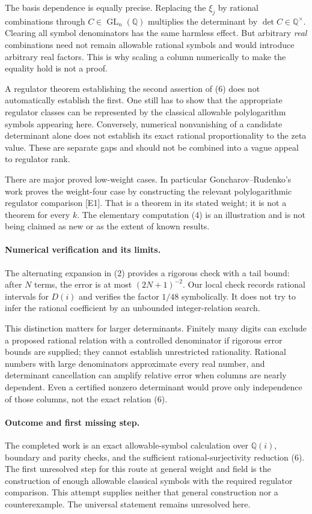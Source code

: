 \documentclass[11pt]{article}
\begin{document}
The basis dependence is equally precise. Replacing the $\xi_j$ by rational combinations through $C\in\operatorname{GL}_n(\mathbb Q)$ multiplies the determinant by $\det C\in\mathbb Q^\times$. Clearing all symbol denominators has the same harmless effect. But arbitrary \emph{real} combinations need not remain allowable rational symbols and would introduce arbitrary real factors. This is why scaling a column numerically to make the equality hold is not a proof.

A regulator theorem establishing the second assertion of (6) does not automatically establish the first. One still has to show that the appropriate regulator classes can be represented by the classical allowable polylogarithm symbols appearing here. Conversely, numerical nonvanishing of a candidate determinant alone does not establish its exact rational proportionality to the zeta value. These are separate gaps and should not be combined into a vague appeal to regulator rank.

There are major proved low-weight cases. In particular Goncharov--Rudenko's work proves the weight-four case by constructing the relevant polylogarithmic regulator comparison [E1]. That is a theorem in its stated weight; it is not a theorem for every $k$. The elementary computation (4) is an illustration and is not being claimed as new or as the extent of known results.

\paragraph{Numerical verification and its limits.}
The alternating expansion in (2) provides a rigorous check with a tail bound: after $N$ terms, the error is at most $(2N+1)^{-2}$. Our local check records rational intervals for $D(i)$ and verifies the factor $1/48$ symbolically. It does not try to infer the rational coefficient by an unbounded integer-relation search.

This distinction matters for larger determinants. Finitely many digits can exclude a proposed rational relation with a controlled denominator if rigorous error bounds are supplied; they cannot establish unrestricted rationality. Rational numbers with large denominators approximate every real number, and determinant cancellation can amplify relative error when columns are nearly dependent. Even a certified nonzero determinant would prove only independence of those columns, not the exact relation (6).

\paragraph{Outcome and first missing step.}
The completed work is an exact allowable-symbol calculation over $\mathbb Q(i)$, boundary and parity checks, and the sufficient rational-surjectivity reduction (6). The first unresolved step for this route at general weight and field is the construction of enough allowable classical symbols with the required regulator comparison. This attempt supplies neither that general construction nor a counterexample. The universal statement remains unresolved here.
\end{document}
